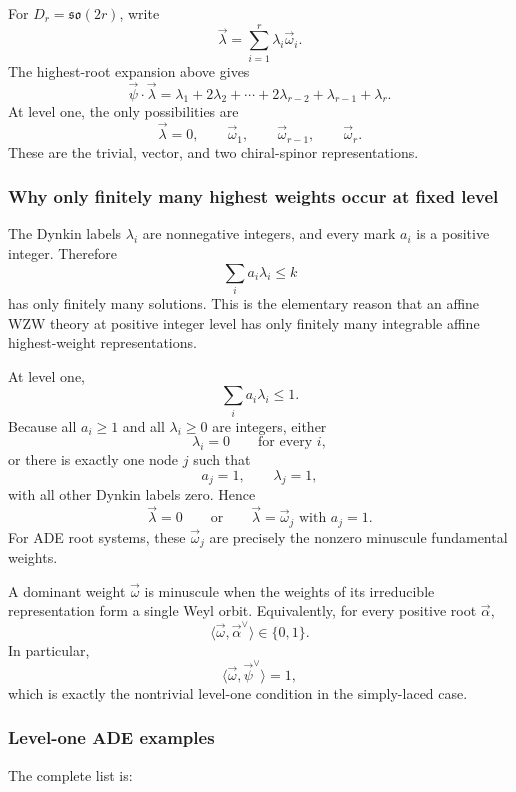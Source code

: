 \documentclass[
  10pt,
  a4paper,
  openany]{book}
\begin{document}
For \(D_r=\mathfrak{so}(2r)\), write \[
\vec\lambda=\sum_{i=1}^r\lambda_i\vec\omega_i.
\] The highest-root expansion above gives \[
\vec\psi\cdot\vec\lambda
=\lambda_1
+2\lambda_2
+\cdots
+2\lambda_{r-2}
+\lambda_{r-1}
+\lambda_r.
\] At level one, the only possibilities are \[
\vec\lambda=0,
\qquad
\vec\omega_1,
\qquad
\vec\omega_{r-1},
\qquad
\vec\omega_r.
\] These are the trivial, vector, and two chiral-spinor representations.

\subsubsection{Why only finitely many highest weights occur at fixed
level}\label{why-only-finitely-many-highest-weights-occur-at-fixed-level}

The Dynkin labels \(\lambda_i\) are nonnegative integers, and every mark
\(a_i\) is a positive integer. Therefore \[
\sum_i a_i\lambda_i\leq k
\] has only finitely many solutions. This is the elementary reason that
an affine WZW theory at positive integer level has only finitely many
integrable affine highest-weight representations.

At level one, \[
\sum_i a_i\lambda_i\leq1.
\] Because all \(a_i\geq1\) and all \(\lambda_i\geq0\) are integers,
either \[
\lambda_i=0
\qquad
\text{for every }i,
\] or there is exactly one node \(j\) such that \[
a_j=1,
\qquad
\lambda_j=1,
\] with all other Dynkin labels zero. Hence \[
\vec\lambda=0
\qquad\text{or}\qquad
\vec\lambda=\vec\omega_j
\text{ with }a_j=1.
\] For ADE root systems, these \(\vec\omega_j\) are precisely the
nonzero minuscule fundamental weights.

A dominant weight \(\vec\omega\) is minuscule when the weights of its
irreducible representation form a single Weyl orbit. Equivalently, for
every positive root \(\vec\alpha\), \[
\langle\vec\omega,\vec\alpha^{\vee}\rangle
\in\{0,1\}.
\] In particular, \[
\langle\vec\omega,\vec\psi^{\vee}\rangle=1,
\] which is exactly the nontrivial level-one condition in the
simply-laced case.

\subsubsection{Level-one ADE examples}\label{level-one-ade-examples}

The complete list is:
\end{document}
